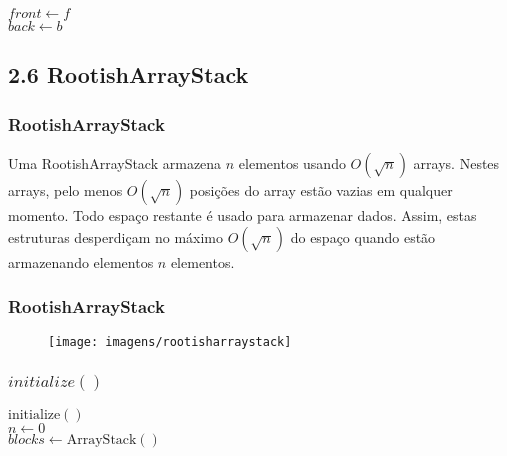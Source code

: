 \documentclass{beamer}
\begin{document}
\begin{frame}[shrink]
\begin{oframed}
\begin{flushleft}
\hspace*{0.5em} \hspace*{1em} $\ensuremath{\ensuremath{\mathit{front}} \gets  \ensuremath{f}}$\\
\hspace*{0.5em} \hspace*{1em} $\ensuremath{\ensuremath{\mathit{back}} \gets  \ensuremath{b}}$\\
\end{flushleft}
\end{oframed}
\end{frame}

\subsection{2.6 RootishArrayStack}
\begin{frame}
\frametitle{RootishArrayStack}
Uma RootishArrayStack
armazena $n$ elementos usando $O(\sqrt{\ensuremath{\ensuremath{\ensuremath{\mathit{n}}}}})$ arrays.  Nestes arrays, pelo menos
 $O(\sqrt{\ensuremath{\ensuremath{\ensuremath{\mathit{n}}}}})$ posições do array estão vazias em qualquer momento.  Todo espaço restante é usado para armazenar dados.  Assim, estas estruturas desperdiçam no máximo $O(\sqrt{\ensuremath{\ensuremath{\ensuremath{\mathit{n}}}}})$ do espaço quando estão armazenando elementos $\ensuremath{\ensuremath{\ensuremath{\mathit{n}}}}$
elementos.
\end{frame}

\begin{frame}
\frametitle{RootishArrayStack}
\begin{figure}
  \begin{center}
    \texttt{[image: imagens/rootisharraystack]}
  \end{center}

\end{figure}
\end{frame}

\begin{frame}
\frametitle{$initialize()$}
\begin{oframed}
\begin{flushleft}
\hspace*{1em} $\ensuremath{\mathrm{initialize}()}$\\
\hspace*{1em} \hspace*{1em} $\ensuremath{\ensuremath{\mathit{n}} \gets  \ensuremath{0}}$\\
\hspace*{1em} \hspace*{1em} $\ensuremath{\ensuremath{\mathit{blocks}} \gets  \ensuremath{\mathrm{\mathrm{ArrayStack}}()}}$\\
\end{flushleft}
\end{oframed}
\end{frame}
\end{document}
